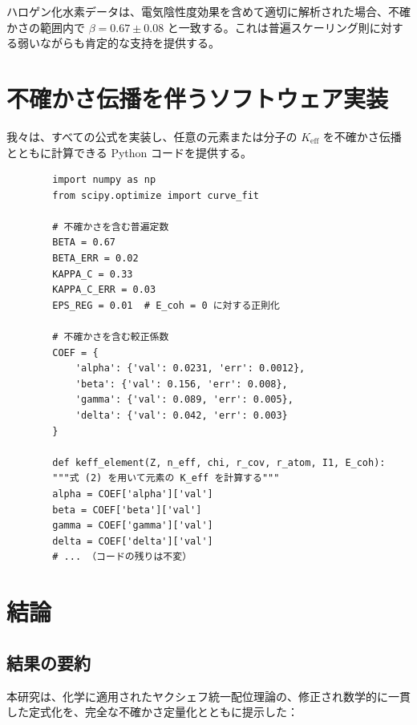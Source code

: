 \documentclass[11pt,a4paper]{article}
\newcommand{\Keff}{K_{\mathrm{eff}}}
\begin{document}
	ハロゲン化水素データは、電気陰性度効果を含めて適切に解析された場合、不確かさの範囲内で $\beta = 0.67 \pm 0.08$ と一致する。これは普遍スケーリング則に対する弱いながらも肯定的な支持を提供する。
	
	\section{不確かさ伝播を伴うソフトウェア実装}
	
	我々は、すべての公式を実装し、任意の元素または分子の $\Keff$ を不確かさ伝播とともに計算できる Python コードを提供する。
	
	\begin{verbatim}
		import numpy as np
		from scipy.optimize import curve_fit
		
		# 不確かさを含む普遍定数
		BETA = 0.67
		BETA_ERR = 0.02
		KAPPA_C = 0.33
		KAPPA_C_ERR = 0.03
		EPS_REG = 0.01  # E_coh = 0 に対する正則化
		
		# 不確かさを含む較正係数
		COEF = {
			'alpha': {'val': 0.0231, 'err': 0.0012},
			'beta': {'val': 0.156, 'err': 0.008},
			'gamma': {'val': 0.089, 'err': 0.005},
			'delta': {'val': 0.042, 'err': 0.003}
		}
		
		def keff_element(Z, n_eff, chi, r_cov, r_atom, I1, E_coh):
		"""式 (2) を用いて元素の K_eff を計算する"""
		alpha = COEF['alpha']['val']
		beta = COEF['beta']['val']
		gamma = COEF['gamma']['val']
		delta = COEF['delta']['val']
		# ... （コードの残りは不変）
	\end{verbatim}
	
	\section{結論}
	\label{sec:conclusion}
	
	\subsection{結果の要約}
	
	本研究は、化学に適用されたヤクシェフ統一配位理論の、修正され数学的に一貫した定式化を、完全な不確かさ定量化とともに提示した：
	
\end{document}
